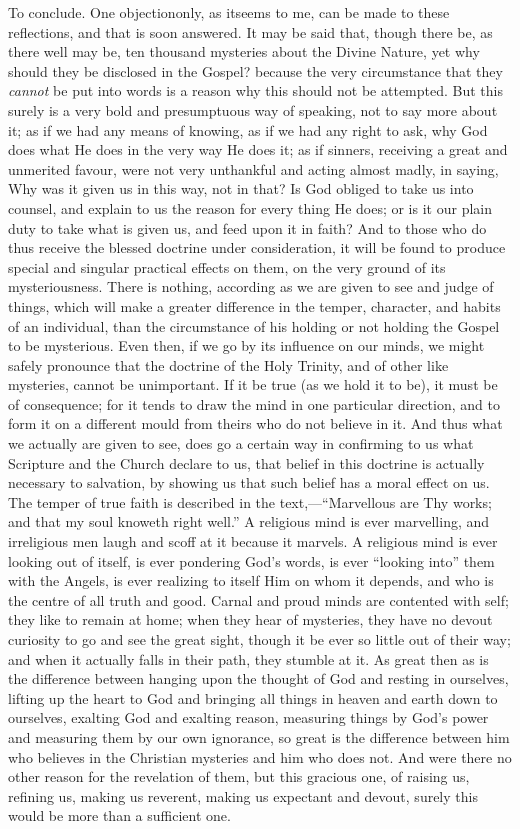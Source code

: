 To conclude. One objection\emph{}only, as it\emph{}seems to me,
can be made to these reflections, and that is soon answered. It may be
said that, though there be, as there well may be, ten thousand
mysteries about the Divine Nature, yet why should they be disclosed in
the Gospel? because the very circumstance that they \emph{cannot} be
put into words is a reason why this should not be attempted. But this
surely is a very bold and presumptuous way of speaking, not to say
more about it; as if we had any means of knowing, as if we had any
right to ask, why God does what He does in the very way He does it; as
if sinners, receiving a great and unmerited favour, were not very
unthankful and acting almost madly, in saying, Why was it given us in
this way, not in that? Is God obliged to take us into counsel, and
explain to us the reason for every thing He does; or is it our plain
duty to take what is given us, and feed upon it in faith? And to those
who do thus receive the blessed doctrine under consideration, it will
be found to produce special and singular practical effects on them, on
the very ground of its mysteriousness. There is nothing, according as
we are given to see and judge of things, which will make a greater
difference in the temper, character, and habits of an individual, than
the circumstance of his holding or not holding the Gospel to be
mysterious. Even then, if we go by its influence on our minds, we
might safely pronounce that the doctrine of the Holy Trinity, and of
other like mysteries, cannot be unimportant. If it be true (as we hold
it to be), it must be of consequence; for it tends to draw the mind in
one particular direction, and to form it on a different mould from
theirs who do not believe in it. And thus what we actually are given
to see, does go a certain way in confirming to us what Scripture and
the Church declare to us, that belief in this doctrine is actually
necessary to salvation, by showing us that such belief has a moral
effect on us. The temper of true faith is described in the text,—``Marvellous
are Thy works; and that my soul knoweth right well.'' A religious
mind is ever marvelling, and irreligious men laugh and scoff at it
because it marvels. A religious mind is ever looking out of itself, is
ever pondering God's words, is ever ``looking into'' them
with the Angels, is ever realizing to itself Him on whom it depends,
and who is the centre of all truth and good. Carnal and proud minds
are contented with self; they like to remain at home; when they hear
of mysteries, they have no devout curiosity to go and see the great
sight, though it be ever so little out of their way; and when it
actually falls in their path, they stumble at it. As great then as is
the difference between hanging upon the thought of God and resting in
ourselves, lifting up the heart to God and bringing all things in
heaven and earth down to ourselves, exalting God and exalting reason,
measuring things by God's power and measuring them by our own
ignorance, so great is the difference between him who believes in the
Christian mysteries and him who does not. And were there no other
reason for the revelation of them, but this gracious one, of raising
us, refining us, making us reverent, making us expectant and devout,
surely this would be more than a sufficient one.

